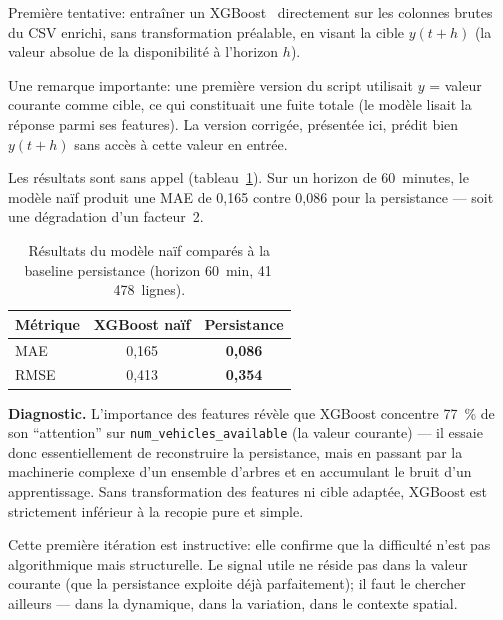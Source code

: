 \documentclass[fleqn, 12pt]{scrartcl}
\begin{document}
\vspace{0.3cm}

Première tentative: entraîner un XGBoost~\cite{chen_xgboost_2016} directement sur les colonnes brutes du CSV enrichi, sans transformation préalable, en visant la cible $y(t+h)$ (la valeur absolue de la disponibilité à l'horizon $h$).

\vspace{0.3cm}

Une remarque importante: une première version du script utilisait $y$ = valeur courante comme cible, ce qui constituait une fuite totale (le modèle lisait la réponse parmi ses features). La version corrigée, présentée ici, prédit bien $y(t+h)$ sans accès à cette valeur en entrée.

\vspace{0.3cm}

Les résultats sont sans appel (tableau~\ref{tab:naive}). Sur un horizon de 60~minutes, le modèle naïf produit une MAE de 0{,}165 contre 0{,}086 pour la persistance --- soit une dégradation d'un facteur~2.

\begin{table}[htp]
\centering
\begin{tabular}{lcc}
\toprule
\textbf{Métrique} & \textbf{XGBoost naïf} & \textbf{Persistance} \\
\midrule
MAE & 0{,}165 & \textbf{0{,}086} \\
RMSE & 0{,}413 & \textbf{0{,}354} \\
\bottomrule
\end{tabular}
\caption{Résultats du modèle naïf comparés à la baseline persistance (horizon 60~min, 41\,478~lignes).}%
\label{tab:naive}
\end{table}

\textbf{Diagnostic.} L'importance des features révèle que XGBoost concentre 77~\% de son ``attention'' sur \texttt{num\_vehicles\_available} (la valeur courante) --- il essaie donc essentiellement de reconstruire la persistance, mais en passant par la machinerie complexe d'un ensemble d'arbres et en accumulant le bruit d'un apprentissage. Sans transformation des features ni cible adaptée, XGBoost est strictement inférieur à la recopie pure et simple.

\vspace{0.3cm}

Cette première itération est instructive: elle confirme que la difficulté n'est pas algorithmique mais structurelle. Le signal utile ne réside pas dans la valeur courante (que la persistance exploite déjà parfaitement); il faut le chercher ailleurs --- dans la dynamique, dans la variation, dans le contexte spatial.
\end{document}
